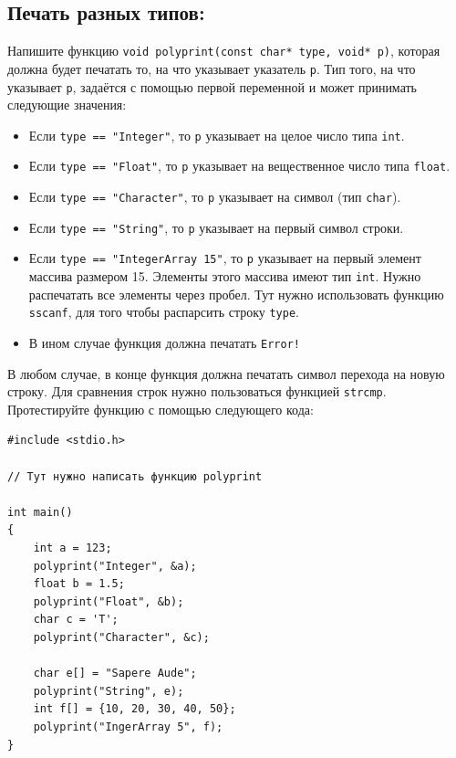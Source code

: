 \documentclass[10pt]{article}
\begin{document}
\subsection{Печать разных типов:}
Напишите функцию \texttt{void polyprint(const char* type, void* p)}, которая должна будет печатать то, на что указывает указатель \texttt{p}. Тип того, на что указывает \texttt{p}, задаётся с помощью первой переменной и может принимать следующие значения:
\begin{itemize}
\item Если \texttt{type == "Integer"}, то \texttt{p} указывает на целое число типа \texttt{int}.
\item Если \texttt{type == "Float"}, то \texttt{p} указывает на вещественное число типа \texttt{float}.
\item Если \texttt{type == "Character"}, то \texttt{p} указывает на символ (тип \texttt{char}).
\item Если \texttt{type == "String"}, то \texttt{p} указывает на первый символ строки.
\item Если \texttt{type == "IntegerArray 15"}, то \texttt{p} указывает на первый элемент массива размером 15. Элементы этого массива имеют тип \texttt{int}. Нужно распечатать все элементы через пробел. Тут нужно использовать функцию \texttt{sscanf}, для того чтобы распарсить строку \texttt{type}.
\item В ином случае функция должна печатать \texttt{Error!}
\end{itemize}
В любом случае, в конце функция должна печатать символ перехода на новую строку. Для сравнения строк нужно пользоваться функцией \texttt{strcmp}. Протестируйте функцию с помощью следующего кода:

\begin{lstlisting}
#include <stdio.h>

// Тут нужно написать функцию polyprint

int main() 
{
    int a = 123;
    polyprint("Integer", &a);
    float b = 1.5;
    polyprint("Float", &b);
    char c = 'T';
    polyprint("Character", &c);
    
    char e[] = "Sapere Aude";
    polyprint("String", e);
    int f[] = {10, 20, 30, 40, 50};
    polyprint("IngerArray 5", f);
}
\end{lstlisting}
\end{document}
